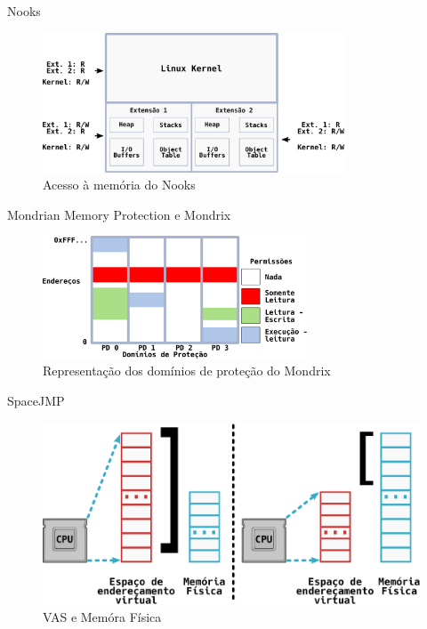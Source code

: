 \documentclass[xcolor={usenames,svgnames,dvipsnames},brazil,english,12pt,aspectratio=149]{beamer}
\begin{document}
\begin{frame}{Nooks}
	\begin{figure}[!h]
		\centering
		\includegraphics[width=0.8\textwidth]{nooks_mem}
		\caption[Acesso à memória do Nooks]{Acesso à memória do Nooks}
		\label{fig:nooks_mem}
	\end{figure}
\end{frame}

\begin{frame}{Mondrian Memory Protection e Mondrix}
	\begin{figure}[!h]
		\centering
		\includegraphics[width=0.7\textwidth]{mondrix_pd}
		\caption{Representação dos domínios de proteção do Mondrix}
		\label{fig:mondrixPD} 
	\end{figure}
\end{frame}

\begin{frame}{SpaceJMP}
	\begin{figure}[!h]
		\centering
		\includegraphics[width=.7\textwidth]{vas_vs_physical_address} 
		\caption{VAS e Memóra Física}
		\label{fig:vas_vs_physical} 
	\end{figure}
\end{frame}
\end{document}

